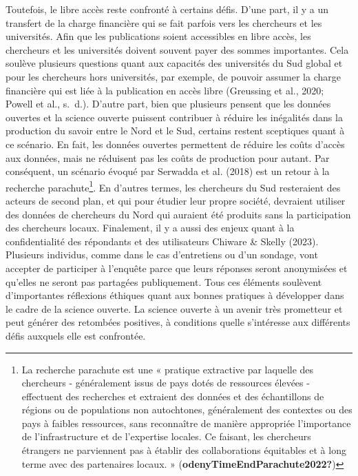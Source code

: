 \documentclass[
  letterpaper,
  DIV=11,
  numbers=noendperiod]{scrreprt}
\begin{document}
Toutefois, le libre accès reste confronté à certains défis. D'une part,
il y a un transfert de la charge financière qui se fait parfois vers les
chercheurs et les universités. Afin que les publications soient
accessibles en libre accès, les chercheurs et les universités doivent
souvent payer des sommes importantes. Cela soulève plusieurs questions
quant aux capacités des universités du Sud global et pour les chercheurs
hors universités, par exemple, de pouvoir assumer la charge financière
qui est liée à la publication en accès libre (Greussing et al., 2020;
Powell et al., s.~d.). D'autre part, bien que plusieurs pensent que les
données ouvertes et la science ouverte puissent contribuer à réduire les
inégalités dans la production du savoir entre le Nord et le Sud,
certains restent sceptiques quant à ce scénario. En fait, les données
ouvertes permettent de réduire les coûts d'accès aux données, mais ne
réduisent pas les coûts de production pour autant. Par conséquent, un
scénario évoqué par Serwadda et al. (2018) est un retour à la recherche
parachute\footnote{La recherche parachute est une « pratique extractive
  par laquelle des chercheurs - généralement issus de pays dotés de
  ressources élevées - effectuent des recherches et extraient des
  données et des échantillons de régions ou de populations non
  autochtones, généralement des contextes ou des pays à faibles
  ressources, sans reconnaître de manière appropriée l'importance de
  l'infrastructure et de l'expertise locales. Ce faisant, les chercheurs
  étrangers ne parviennent pas à établir des collaborations équitables
  et à long terme avec des partenaires locaux. »
  (\textbf{odenyTimeEndParachute2022?})}. En d'autres termes, les
chercheurs du Sud resteraient des acteurs de second plan, et qui pour
étudier leur propre société, devraient utiliser des données de
chercheurs du Nord qui auraient été produits sans la participation des
chercheurs locaux. Finalement, il y a aussi des enjeux quant à la
confidentialité des répondants et des utilisateurs Chiware \& Skelly
(2023). Plusieurs individus, comme dans le cas d'entretiens ou d'un
sondage, vont accepter de participer à l'enquête parce que leurs
réponses seront anonymisées et qu'elles ne seront pas partagées
publiquement. Tous ces éléments soulèvent d'importantes réflexions
éthiques quant aux bonnes pratiques à développer dans le cadre de la
science ouverte. La science ouverte à un avenir très prometteur et peut
générer des retombées positives, à conditions quelle s'intéresse aux
différents défis auxquels elle est confrontée.
\end{document}
